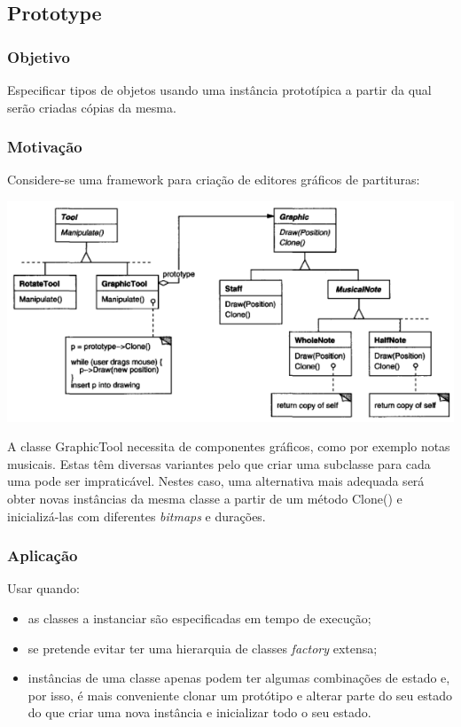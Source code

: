 \subsection{Prototype}

\subsubsection{Objetivo}

Especificar tipos de objetos usando uma instância prototípica a partir da qual serão criadas cópias da mesma.

\subsubsection{Motivação}

Considere-se uma framework para criação de editores gráficos de partituras:

\centerline{\includegraphics[scale=.7]{img/prototype/motivation.png}}

A classe GraphicTool necessita de componentes gráficos, como por exemplo notas musicais. Estas têm diversas variantes pelo que criar uma subclasse para cada uma pode ser impraticável. Nestes caso, uma alternativa mais adequada será obter novas instâncias da mesma classe a partir de um método Clone() e inicializá-las com diferentes \textit{bitmaps} e durações.

\subsubsection{Aplicação}

Usar quando:
\begin{itemize}
\item as classes a instanciar são especificadas em tempo de execução;
\item se pretende evitar ter uma hierarquia de classes \textit{factory} extensa;
\item instâncias de uma classe apenas podem ter algumas combinações de estado e, por isso, é mais conveniente clonar um protótipo e alterar parte do seu estado do que criar uma nova instância e inicializar todo o seu estado.
\end{itemize}

